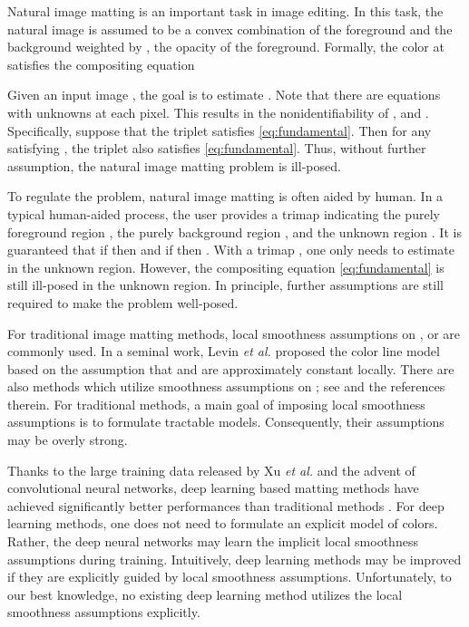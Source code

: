 \documentclass{article}
\theoremstyle{plain}
\begin{document}
Natural image matting is an important task in image editing.
In this task,
the natural image  is assumed to be a convex combination of the
foreground  and 
the background 
weighted by , the opacity of the foreground.
Formally,
the color at  satisfies the compositing equation
{\small

}Given an input image ,
the goal is to estimate .
Note that there are  equations with  unknowns at each pixel.
This results in the nonidentifiability of ,  and .
Specifically, suppose that the triplet  satisfies \eqref{eq:fundamental}.
Then for any  satisfying ,
the triplet  also satisfies \eqref{eq:fundamental}.
Thus, without further assumption, the natural image matting problem is ill-posed.


To regulate the problem,
natural image matting is often aided by human.
In a typical human-aided process,
the user provides a trimap  indicating
the purely foreground region , 
the purely background region ,
and the unknown region .
It is guaranteed that if  then  and if  then .
With a trimap , one only needs to estimate  in the unknown region.
However, the compositing equation \eqref{eq:fundamental} is still ill-posed in the unknown region.
In principle, 
further assumptions are still required to make the problem well-posed.





For traditional image matting methods,
local smoothness assumptions on ,  or  are commonly used.
In a seminal work,
Levin \emph{et al.} \cite{Levin2008AClosed-Form} proposed the color line model based on the assumption that  and  are approximately constant locally.
There are also methods which utilize smoothness assumptions on ; 
see \cite{Price2010Simultaneous} and the references therein.
For traditional methods,
a main goal of
imposing local smoothness assumptions
is to formulate tractable models.
Consequently, their assumptions may be overly strong.

Thanks to the large training data released by Xu \emph{et al.} \cite{Xu2017DeepImageMatting}
and the advent of convolutional neural networks,
deep learning based matting methods have
achieved significantly better performances than traditional methods \cite{Xu2017DeepImageMatting,Li2020NaturalImageMatting,Tang2019Learning-Based,Forte2020FBA,Yu2021High-ResolutionDeepImageMatting,Sun2021SemanticImageMatting}.
For deep learning methods,
one does not need to formulate an explicit model of colors.
Rather, the deep neural networks may learn the implicit local smoothness assumptions during training.
Intuitively, deep learning methods may be improved if they are explicitly guided by local smoothness assumptions.
Unfortunately, to our best knowledge, no existing deep learning method utilizes the local smoothness assumptions explicitly.
\end{document}
